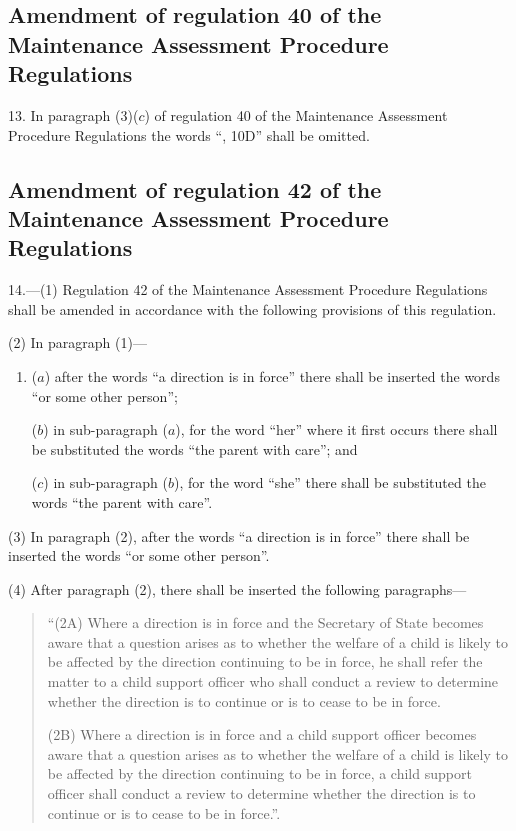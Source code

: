 \documentclass[12pt,a4paper]{article}
\begin{document}
\subsection[13. Amendment of regulation 40 of the Maintenance Assessment Procedure Regulations]{Amendment of regulation 40 of the Maintenance Assessment Procedure Regulations}

13.  In paragraph (3)($c$) of regulation 40 of the Maintenance Assessment Procedure Regulations the words “, 10D” shall be omitted.

\subsection[14. Amendment of regulation 42 of the Maintenance Assessment Procedure Regulations]{Amendment of regulation 42 of the Maintenance Assessment Procedure Regulations}

14.—(1) Regulation 42 of the Maintenance Assessment Procedure Regulations shall be amended in accordance with the following provisions of this regulation.

(2) In paragraph (1)---
\begin{enumerate}\item[]
($a$) after the words “a direction is in force” there shall be inserted the words “or some other person”;

($b$) in sub-paragraph ($a$), for the word “her” where it first occurs there shall be substituted the words “the parent with care”; and

($c$) in sub-paragraph ($b$), for the word “she” there shall be substituted the words “the parent with care”.
\end{enumerate}

(3) In paragraph (2), after the words “a direction is in force” there shall be inserted the words “or some other person”.

(4) After paragraph (2), there shall be inserted the following paragraphs---
\begin{quotation}
“(2A) Where a direction is in force and the Secretary of State becomes aware that a question arises as to whether the welfare of a child is likely to be affected by the direction continuing to be in force, he shall refer the matter to a child support officer who shall conduct a review to determine whether the direction is to continue or is to cease to be in force.

(2B) Where a direction is in force and a child support officer becomes aware that a question arises as to whether the welfare of a child is likely to be affected by the direction continuing to be in force, a child support officer shall conduct a review to determine whether the direction is to continue or is to cease to be in force.”.
\end{quotation}
\end{document}
